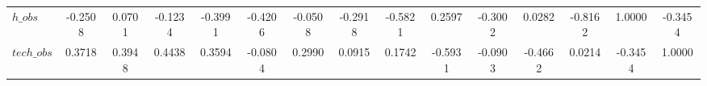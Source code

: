 \begin{center}
\begin{longtable}{lcccccccccccccc}
$h\_obs         $	 & 	          -0.2508	 & 	           0.0701	 & 	          -0.1234	 & 	          -0.3991	 & 	          -0.4206	 & 	          -0.0508	 & 	          -0.2918	 & 	          -0.5821	 & 	           0.2597	 & 	          -0.3002	 & 	           0.0282	 & 	          -0.8162	 & 	           1.0000	 & 	          -0.3454 \\ 
$tech\_obs      $	 & 	           0.3718	 & 	           0.3948	 & 	           0.4438	 & 	           0.3594	 & 	          -0.0804	 & 	           0.2990	 & 	           0.0915	 & 	           0.1742	 & 	          -0.5931	 & 	          -0.0903	 & 	          -0.4662	 & 	           0.0214	 & 	          -0.3454	 & 	           1.0000 \\ 
\end{longtable}
 \end{center}
